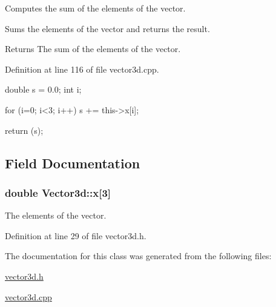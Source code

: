\-Computes the sum of the elements of the vector. 

\-Sums the elements of the vector and returns the result. \begin{DoxyReturn}{\-Returns}
\-The sum of the elements of the vector. 
\end{DoxyReturn}


\-Definition at line 116 of file vector3d.\-cpp.


\begin{DoxyCode}
{
  double s = 0.0;
  int i;
  
  for (i=0; i<3; i++)
    {
      s += this->x[i];
    }
  
  return (s);
}
\end{DoxyCode}


\subsection{\-Field \-Documentation}
\hypertarget{classVector3d_ae5e82a2be7cc2e195e56875a5befe509}{
\subsubsection[{x}]{\setlength{\rightskip}{0pt plus 5cm}double {\bf \-Vector3d\-::x}\mbox{[}3\mbox{]}}}\label{df/dd0/classVector3d_ae5e82a2be7cc2e195e56875a5befe509}


\-The elements of the vector. 



\-Definition at line 29 of file vector3d.\-h.



\-The documentation for this class was generated from the following files\-:\begin{DoxyCompactItemize}
\item 
\hyperlink{vector3d_8h}{vector3d.\-h}\item 
\hyperlink{vector3d_8cpp}{vector3d.\-cpp}\end{DoxyCompactItemize}
